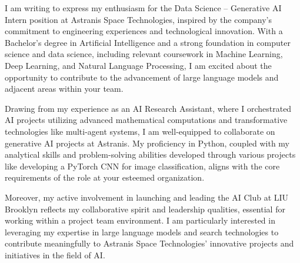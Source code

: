 \documentclass[]{cover}
\begin{document}

\hfill

\begin{minipage}[t]{0.5\textwidth}
\end{minipage}

\begin{minipage}[t]{0.49\textwidth}
\currentdate{\today}
\end{minipage}


I am writing to express my enthusiasm for the Data Science – Generative AI Intern position at Astranis Space Technologies, inspired by the company's commitment to engineering experiences and technological innovation. With a Bachelor's degree in Artificial Intelligence and a strong foundation in computer science and data science, including relevant coursework in Machine Learning, Deep Learning, and Natural Language Processing, I am excited about the opportunity to contribute to the advancement of large language models and adjacent areas within your team.

Drawing from my experience as an AI Research Assistant, where I orchestrated AI projects utilizing advanced mathematical computations and transformative technologies like multi-agent systems, I am well-equipped to collaborate on generative AI projects at Astranis. My proficiency in Python, coupled with my analytical skills and problem-solving abilities developed through various projects like developing a PyTorch CNN for image classification, aligns with the core requirements of the role at your esteemed organization.

Moreover, my active involvement in launching and leading the AI Club at LIU Brooklyn reflects my collaborative spirit and leadership qualities, essential for working within a project team environment. I am particularly interested in leveraging my expertise in large language models and search technologies to contribute meaningfully to Astranis Space Technologies' innovative projects and initiatives in the field of AI.


\signature{Adem Mcharek}
\end{document}
